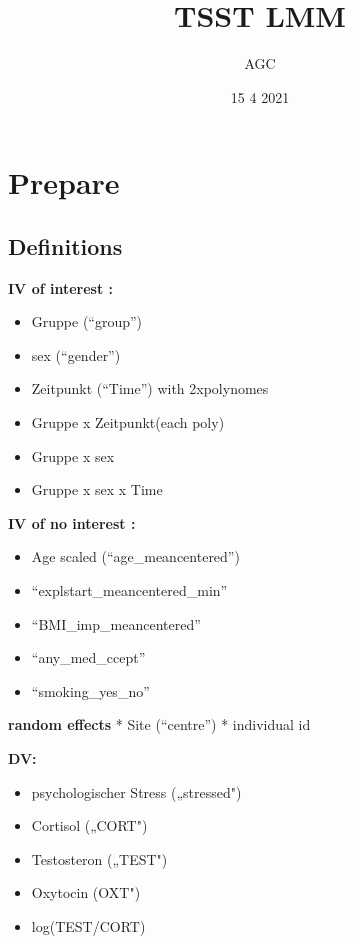 \documentclass[
]{article}
\title{TSST LMM}
\author{AGC}
\date{15 4 2021}
\providecommand{\tightlist}{%
  \setlength{\itemsep}{0pt}\setlength{\parskip}{0pt}}
\begin{document}
\maketitle

\hypertarget{prepare}{%
\section{Prepare}\label{prepare}}

\hypertarget{definitions}{%
\subsection{Definitions}\label{definitions}}

\textbf{IV of interest :}

\begin{itemize}
\tightlist
\item
  Gruppe (``group'')
\item
  sex (``gender'')
\item
  Zeitpunkt (``Time'') with 2xpolynomes
\item
  Gruppe x Zeitpunkt(each poly)
\item
  Gruppe x sex
\item
  Gruppe x sex x Time
\end{itemize}

\textbf{IV of no interest :}

\begin{itemize}
\tightlist
\item
  Age scaled (``age\_meancentered'')
\item
  ``explstart\_meancentered\_min''
\item
  ``BMI\_imp\_meancentered''
\item
  ``any\_med\_ccept''
\item
  ``smoking\_yes\_no''
\end{itemize}

\textbf{random effects} * Site (``centre'') * individual id

\textbf{DV:}

\begin{itemize}
\tightlist
\item
  psychologischer Stress („stressed")
\item
  Cortisol („CORT")
\item
  Testosteron („TEST")
\item
  Oxytocin (OXT")
\item
  log(TEST/CORT)
\end{itemize}
\end{document}
